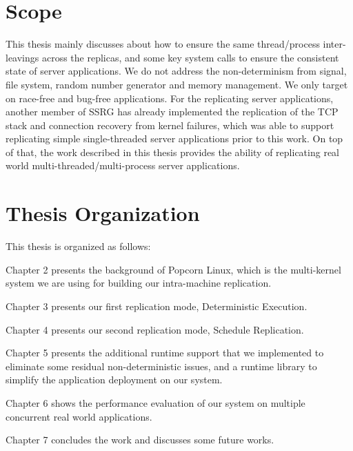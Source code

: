 \section{Scope}
This thesis mainly discusses about how to ensure the same thread/process inter-leavings across the replicas, and some key system calls to ensure the consistent state of server applications. We do not address the non-determinism from signal, file system, random number generator and memory management. We only target on race-free and bug-free applications. For the replicating server applications, another member of SSRG has already implemented the replication of the TCP stack and connection recovery from kernel failures, which was able to support replicating simple single-threaded server applications prior to this work. On top of that, the work described in this thesis provides the ability of replicating real world multi-threaded/multi-process server applications.

\section{Thesis Organization}
This thesis is organized as follows:

Chapter 2 presents the background of Popcorn Linux, which is the multi-kernel system we are using for building our intra-machine replication.

Chapter 3 presents our first replication mode, Deterministic Execution. 

Chapter 4 presents our second replication mode, Schedule Replication.

Chapter 5 presents the additional runtime support that we implemented to eliminate some residual non-deterministic issues, and a runtime library to simplify the application deployment on our system.

Chapter 6 shows the performance evaluation of our system on multiple concurrent real world applications.

Chapter 7 concludes the work and discusses some future works.